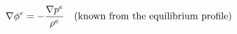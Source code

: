 \documentclass[preview]{standalone}
\begin{document}
\begin{align*}
\special{dvisvgm:raw <g id='unique000'>}\nabla\phi^e = -\frac{\nabla p^e}{\rho^e} \quad\text{(known from the equilibrium profile)}\special{dvisvgm:raw </g>}
\end{align*}
\end{document}
